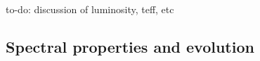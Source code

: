 \documentclass[twocolumn]{aastex63}
\def\ion#1#2{#1$\;${\footnotesize\rm{#2}}\relax}
\newcommand{\todo}[1]{{\color{magenta} to-do: {#1}}}
\newcommand{\tfl}{$t_\mathrm{fl}$}
\newcommand{\tbmax}{$T_{B,\mathrm{max}}$}
\newcommand{\kms}{km\,s$^{-1}$}
\newcommand{\sn}{SN\,2019yvq}
\begin{document}
\todo{discussion of luminosity, teff, etc}

\subsection{Spectral properties and evolution}\label{sec:spec}



\end{document}
